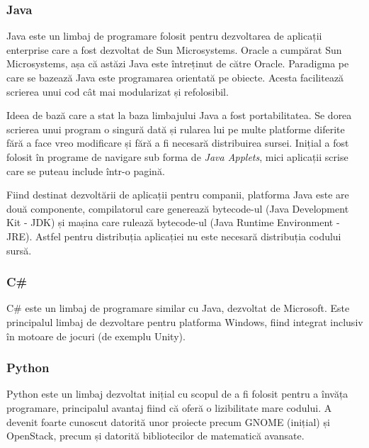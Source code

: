 \subsubsection{Java}
\label{sec:appdev:hybrid-lang:java}

Java este un limbaj de programare folosit pentru dezvoltarea de aplicații
enterprise care a fost dezvoltat de Sun Microsystems. Oracle a cumpărat Sun
Microsystems, așa că astăzi Java este întreținut de către Oracle. Paradigma pe
care se bazează Java este programarea orientată pe obiecte. Acesta facilitează
scrierea unui cod cât mai modularizat și refolosibil.

Ideea de bază care a stat la baza limbajului Java a fost portabilitatea. Se dorea
scrierea unui program o singură dată și rularea lui pe multe platforme diferite
fără a face vreo modificare și fără a fi necesară distribuirea sursei. Inițial a
fost folosit în programe de navigare sub forma de \textit{Java Applets}, mici
aplicații scrise care se puteau include într-o pagină.

Fiind destinat dezvoltării de aplicații pentru companii, platforma Java este are
două componente, compilatorul care generează bytecode-ul (Java Development Kit -
JDK) și mașina care rulează bytecode-ul (Java
Runtime Environment - JRE). Astfel pentru
distribuția aplicației nu este necesară distribuția codului sursă.

\subsubsection{C\#}
\label{sec:appdev:hybrid-lang:csharp}

C\# este un limbaj de programare similar cu Java, dezvoltat de Microsoft. Este
principalul limbaj de dezvoltare pentru platforma Windows, fiind integrat
inclusiv în motoare de jocuri (de exemplu Unity).

\subsubsection{Python}
\label{sec:appdev:hybrid-lang:python}

Python este un limbaj dezvoltat inițial cu scopul de a fi folosit pentru a
învăța programare, principalul avantaj fiind că oferă o lizibilitate mare
codului. A devenit foarte cunoscut datorită unor proiecte precum GNOME (inițial)
și OpenStack, precum și datorită bibliotecilor de matematică avansate.

